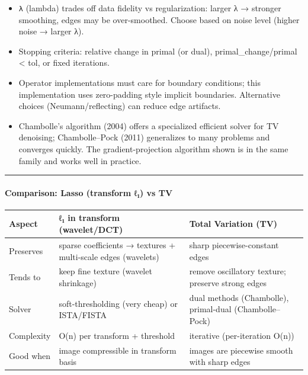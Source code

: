 \documentclass[11pt]{article}
\providecommand{\tightlist}{%
      \setlength{\itemsep}{0pt}\setlength{\parskip}{0pt}}
\begin{document}
\begin{itemize}
\tightlist
\item
  \texttt{λ} (lambda) trades off data fidelity vs regularization: larger
  λ → stronger smoothing, edges may be over-smoothed. Choose based on
  noise level (higher noise → larger λ).
\item
  Stopping criteria: relative change in primal (or dual),
  \textbar\textbar primal\_change\textbar\textbar/\textbar\textbar primal\textbar\textbar{}
  \textless{} tol, or fixed iterations.
\item
  Operator implementations must care for boundary conditions; this
  implementation uses zero-padding style implicit boundaries.
  Alternative choices (Neumann/reflecting) can reduce edge artifacts.
\item
  Chambolle's algorithm (2004) offers a specialized efficient solver for
  TV denoising; Chambolle--Pock (2011) generalizes to many problems and
  converges quickly. The gradient-projection algorithm shown is in the
  same family and works well in practice.
\end{itemize}

\begin{center}\rule{0.5\linewidth}{0.5pt}\end{center}

\hypertarget{comparison-lasso-transform-ux2113ux2081-vs-tv}{%
\paragraph{\texorpdfstring{\textbf{Comparison: Lasso (transform ℓ₁) vs
TV}}{Comparison: Lasso (transform ℓ₁) vs TV}}\label{comparison-lasso-transform-ux2113ux2081-vs-tv}}

\begin{longtable}[]{@{}
  >{\raggedright\arraybackslash}p{}
  >{\raggedleft\arraybackslash}p{}
  >{\raggedright\arraybackslash}p{}@{}}
\toprule
Aspect & ℓ₁ in transform (wavelet/DCT) & Total Variation (TV) \\
\midrule
\endhead
Preserves & sparse coefficients → textures + multi-scale edges
(wavelets) & sharp piecewise-constant edges \\
Tends to & keep fine texture (wavelet shrinkage) & remove oscillatory
texture; preserve strong edges \\
Solver & soft-thresholding (very cheap) or ISTA/FISTA & dual methods
(Chambolle), primal-dual (Chambolle--Pock) \\
Complexity & O(n) per transform + threshold & iterative (per-iteration
O(n)) \\
Good when & image compressible in transform basis & images are piecewise
smooth with sharp edges \\
\bottomrule
\end{longtable}
\end{document}
